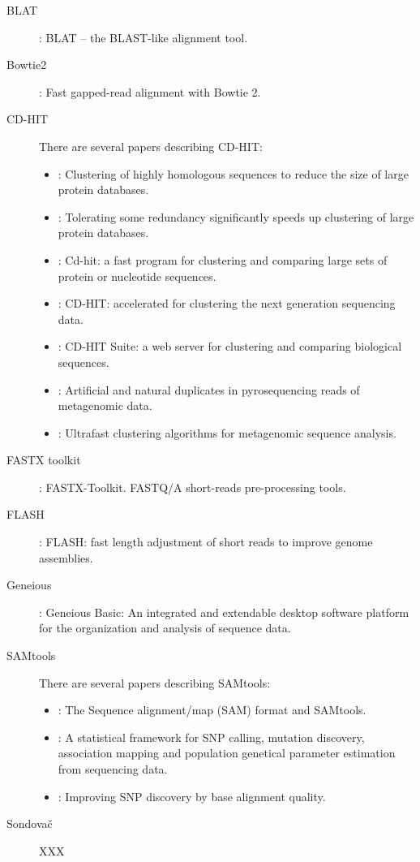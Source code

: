\documentclass[a4paper, 11pt, twoside]{article}
\begin{document}
\begin{description}
 \item[BLAT] \citet{Kent2002}: BLAT -- the BLAST-like alignment tool.
 \item[Bowtie2] \citet{Langmead2012}: Fast gapped-read alignment with Bowtie 2.
 \item[CD-HIT] There are several papers describing CD-HIT:
  \begin{itemize}
    \item \citet{Li2001}: Clustering of highly homologous sequences to reduce the size of large protein databases.
    \item \citet{Li2002}: Tolerating some redundancy significantly speeds up clustering of large protein databases.
    \item \citet{Li2006}: Cd-hit: a fast program for clustering and comparing large sets of protein or nucleotide sequences.
    \item \citet{Fu2012}: CD-HIT: accelerated for clustering the next generation sequencing data.
    \item \citet{Huang2010}: CD-HIT Suite: a web server for clustering and comparing biological sequences.
    \item \citet{Niu2010}: Artificial and natural duplicates in pyrosequencing reads of metagenomic data.
    \item \citet{Li2012b}: Ultrafast clustering algorithms for metagenomic sequence analysis.
   \end{itemize}
 \item[FASTX toolkit] \citet{Gordon2010}: FASTX-Toolkit. FASTQ/A short-reads pre-processing tools.
 \item[FLASH] \citet{Magoc2011}: FLASH: fast length adjustment of short reads to improve genome assemblies.
 \item[Geneious] \citet{Kearse2012}: Geneious Basic: An integrated and extendable desktop software platform for the organization and analysis of sequence data.
 \item[SAMtools] There are several papers describing SAMtools:
  \begin{itemize}
   \item \citet{Li2009}: The Sequence alignment/map (SAM) format and SAMtools.
   \item \citet{Li2011}: A statistical framework for SNP calling, mutation discovery, association mapping and population genetical parameter estimation from sequencing data.
   \item \citet{Li2011a}: Improving SNP discovery by base alignment quality.
  \end{itemize}
 \item[Sondovač] XXX
\end{description}
\end{document}
